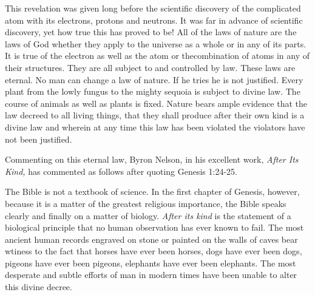 This revelation was given long before the scientific discovery of the complicated atom with
its electrons, protons and neutrons. It was far in advance of scientific discovery, yet how true
this has proved to be! All of the laws of nature are the laws of God whether they apply to the
universe as a whole or in any of its parts. It is true of the electron as well as the atom or thecombination of atoms in any of their structures. They are all subject to and controlled by law.
These laws are eternal. No man can change a law of nature. If he tries he is not justified.
Every plant from the lowly fungus to the mighty sequoia is subject to divine law. The course
of animals as well as plants is fixed. Nature bears ample evidence that the law decreed to all
living things, that they shall produce after their own kind is a divine law and wherein at any
time this law has been violated the violators have not been justified.

Commenting on this eternal law, Byron Nelson, in his excellent work, \textit{After Its Kind,} has
commented as follows after quoting Genesis 1:24-25.

The Bible is not a textbook of science. In the first chapter of Genesis, however, because it is
a matter of the greatest religious importance, the Bible speaks clearly and finally on a matter
of biology. \textit{After its kind} is the statement of a biological principle that no human observation
has ever known to fail. The most ancient human records engraved on stone or painted on the
walls of caves bear wtiness to the fact that horses have ever been horses, dogs have ever been
dogs, pigeons have ever been pigeons, elephants have ever been elephants. The most
desperate and subtle efforts of man in modern times have been unable to alter this divine
decree.

